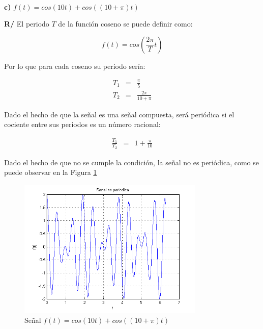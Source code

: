 \documentclass[twocolumn]{article}
\begin{document}
$\,$

\textbf{c)} $f(t) = cos(10t) + cos((10+\pi)t)$

\textbf{R/} El periodo $T$ de la función coseno se puede definir como:

$$f(t) = cos\left(\frac{2\pi}{T}t\right)$$

Por lo que para cada coseno su periodo sería:

\begin{eqnarray*}
T_1 &=& \frac{\pi}{5}\\
T_2 &=& \frac{2\pi}{10 + \pi}
\end{eqnarray*}

Dado el hecho de que la señal es una señal compuesta, será periódica si el cociente entre sus periodos es un número racional:

\begin{eqnarray*}
\frac{T_1}{T_2} &=& 1 + \frac{\pi}{10}
\end{eqnarray*}

Dado el hecho de que no se cumple la condición, la señal no es periódica, como se puede observar en la Figura \ref{fig_5c}

\begin{figure}[!t]
\centering
\includegraphics[width=3.5in]{imgs/5c.png}
\caption{Señal $f(t) = cos(10t) + cos((10+\pi)t)$}
\label{fig_5c}
\end{figure}
\end{document}
